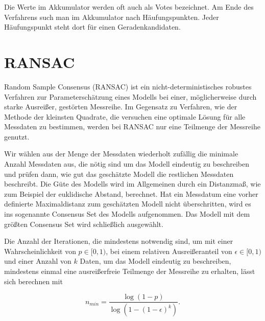 Die Werte im Akkumulator werden oft auch als Votes bezeichnet. Am Ende des Verfahrens such man im Akkumulator nach Häufungspunkten. Jeder Häufungspunkt steht dort für einen Geradenkandidaten.




\section{RANSAC}
\label{s:ransac}
Random Sample Consensus (RANSAC) \cite{Fischler1981} ist ein nicht-deterministisches robustes Verfahren zur Parameterschätzung eines Modells bei einer, möglicherweise durch starke Ausreißer, gestörten Messreihe. 
Im Gegensatz zu Verfahren, wie der Methode der kleinsten Quadrate, die versuchen eine optimale Lösung für alle Messdaten zu bestimmen, werden bei RANSAC nur eine Teilmenge der Messreihe genutzt. 

Wir wählen aus der Menge der Messdaten wiederholt zufällig die minimale Anzahl Messdaten aus, die nötig sind um das Modell eindeutig zu beschreiben und prüfen dann, wie gut das geschätzte Modell die restlichen Messdaten beschreibt. 
Die Güte des Modells wird im Allgemeinen durch ein Distanzmaß, wie zum Beispiel der euklidische Abstand, berechnet. 
Hat ein Messdatum eine vorher definierte Maximaldistanz zum geschätzten Modell nicht überschritten, wird es ins sogenannte Consensus Set des Modells aufgenommen. 
Das Modell mit dem größten Consensus Set wird schließlich ausgewählt. 

Die Anzahl der Iterationen, die mindestens notwendig sind, um mit einer Wahrscheinlichkeit von $p \in [0,1)$, bei einem relativen Ausreißeranteil von $\epsilon \in[0,1)$ und einer Anzahl von $k$ Daten, um das Modell eindeutig zu beschreiben, mindestens einmal eine ausreißerfreie Teilmenge der Messreihe zu erhalten, lässt sich berechnen mit \cite{Fischler1981}

\begin{equation}
n_{min} = \frac{\log{\left(1-p\right)}}{\log{\left(1-\left(1-\epsilon\right)^k\right)}}.
\end{equation}


